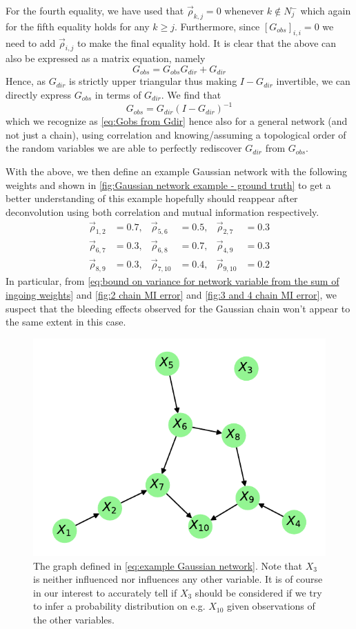 \documentclass[../Thesis.tex]{subfiles}
\begin{document}
For the fourth equality, we have used that $\vec{\rho}_{k,j} = 0$ whenever $k \not\in N^-_j$ which again for the fifth equality holds for any $k \geq j$. Furthermore, since $\left[G_{obs}\right]_{i,i} = 0$ we need to add $\vec{\rho}_{i,j}$ to make the final equality hold. It is clear that the above can also be expressed as a matrix equation, namely
$$G_{obs} = G_{obs}G_{dir} + G_{dir}$$
Hence, as $G_{dir}$ is strictly upper triangular thus making $I - G_{dir}$ invertible, we can directly express $G_{obs}$ in terms of $G_{dir}$. We find that
$$G_{obs} = G_{dir} \left(I - G_{dir}\right)^{-1}$$
which we recognize as \autoref{eq:Gobs from Gdir} hence also for a general network (and not just a chain), using correlation and knowing/assuming a topological order of the random variables we are able to perfectly rediscover $G_{dir}$ from $G_{obs}$.

With the above, we then define an example Gaussian network with the following weights and shown in \autoref{fig:Gaussian network example - ground truth} to get a better understanding of this example hopefully should reappear after deconvolution using both correlation and mutual information respectively.
\begin{equation}\label{eq:example Gaussian network}
    \begin{aligned}
        \vec{\rho}_{1,2} & = 0.7, & \vec{\rho}_{5,6} & = 0.5, & \vec{\rho}_{2,7} & = 0.3\\
        \vec{\rho}_{6,7} & = 0.3, & \vec{\rho}_{6,8} & = 0.7, & \vec{\rho}_{4,9} & = 0.3\\
        \vec{\rho}_{8,9} & = 0.3, & \vec{\rho}_{7,10} & = 0.4, & \vec{\rho}_{9,10} & = 0.2
    \end{aligned}
\end{equation}
In particular, from \autoref{eq:bound on variance for network variable from the sum of ingoing weights} and \autoref{fig:2 chain MI error} and \autoref{fig:3 and 4 chain MI error}, we suspect that the bleeding effects observed for the Gaussian chain won't appear to the same extent in this case.
\begin{figure}[h]
    \centering
    \includegraphics[width = .6\linewidth]{figures/Gaussian Network Theoretical/Network graph - ground truth.pdf}
    \caption{The graph defined in \autoref{eq:example Gaussian network}. Note that $X_3$ is neither influenced nor influences any other variable. It is of course in our interest to accurately tell if $X_3$ should be considered if we try to infer a probability distribution on e.g. $X_{10}$ given observations of the other variables.}
    \label{fig:Gaussian network example - ground truth}
\end{figure}
\end{document}
